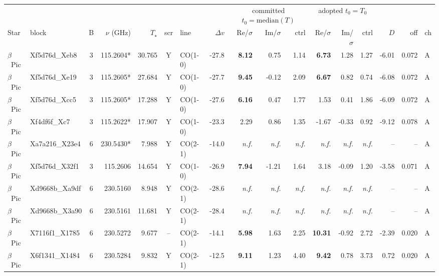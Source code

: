 \begin{tabular}{@{}l@{~}l@{~}c@{~}r@{~}r@{~}c@{~}l@{~}r@{~~}r@{~}r@{~}r@{~~}r@{~}r@{~}r@{~~}r@{~}r@{~}l@{}}
\hline
& & & & & & & & \multicolumn{3}{c}{committed $t_0=\mathrm{median}(T)$} & \multicolumn{3}{c}{adopted $t_0=T_0$} & & & \\
Star & block & B & $\nu$ (GHz) & $T_\star$ & scr & line & $\Delta v$ & Re/$\sigma$ & Im/$\sigma$ & ctrl & Re/$\sigma$ & Im/$\sigma$ & ctrl & $D$ & off & ch \\
\hline
$\beta$~Pic & Xf5d76d\_Xeb8 & 3 & 115.2604* & 30.765 & Y & CO(1-0) & -27.8 & \textbf{8.12} & 0.75 & 1.14 & \textbf{6.73} & 1.28 & 1.27 & -6.01 & 0.072 & A \\
$\beta$~Pic & Xf5d76d\_Xe19 & 3 & 115.2605* & 27.684 & Y & CO(1-0) & -27.7 & \textbf{9.45} & -0.12 & 2.09 & \textbf{6.67} & 0.82 & 0.74 & -6.08 & 0.072 & A \\
$\beta$~Pic & Xf5d76d\_Xcc5 & 3 & 115.2605* & 17.288 & Y & CO(1-0) & -27.6 & \textbf{6.16} & 0.47 & 1.77 & 1.53 & 0.41 & 1.86 & -6.09 & 0.072 & A \\
$\beta$~Pic & Xf4df6f\_Xc7 & 3 & 115.2622* & 17.907 & Y & CO(1-0) & -23.3 & 2.29 & 0.86 & 1.35 & -1.67 & -0.33 & 0.92 & -9.12 & 0.078 & A \\
$\beta$~Pic & Xa7a216\_X23e4 & 6 & 230.5430* & 7.988 & Y & CO(2-1) & -14.0 & \emph{n.f.} & \emph{n.f.} & \emph{n.f.} & \emph{n.f.} & \emph{n.f.} & \emph{n.f.} & -- & -- & A \\
$\beta$~Pic & Xf5d76d\_X32f1 & 3 & 115.2606 & 14.654 & Y & CO(1-0) & -26.9 & \textbf{7.94} & -1.21 & 1.64 & 3.18 & -0.09 & 1.20 & -3.58 & 0.071 & A \\
$\beta$~Pic & Xd9668b\_Xa9df & 6 & 230.5160 & 8.948 & Y & CO(2-1) & -28.6 & \emph{n.f.} & \emph{n.f.} & \emph{n.f.} & \emph{n.f.} & \emph{n.f.} & \emph{n.f.} & -- & -- & A \\
$\beta$~Pic & Xd9668b\_X3a90 & 6 & 230.5161 & 11.681 & Y & CO(2-1) & -28.4 & \emph{n.f.} & \emph{n.f.} & \emph{n.f.} & \emph{n.f.} & \emph{n.f.} & \emph{n.f.} & -- & -- & A \\
$\beta$~Pic & X7116f1\_X1785 & 6 & 230.5272 & 9.677 & -- & CO(2-1) & -14.1 & \textbf{5.98} & 1.63 & 2.25 & \textbf{10.31} & -0.92 & 2.72 & -2.39 & 0.020 & A \\
$\beta$~Pic & X6f1341\_X1484 & 6 & 230.5284 & 9.832 & Y & CO(2-1) & -12.5 & \textbf{9.11} & 1.23 & 4.40 & \textbf{9.42} & 0.78 & 3.73 & 0.72 & 0.020 & A \\

\end{tabular}
